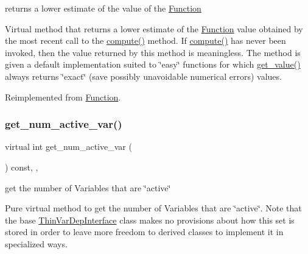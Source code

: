 returns a lower estimate of the value of the \mbox{\hyperlink{class_s_m_spp__di__unipi__it_1_1_function}{Function}} 

Virtual method that returns a lower estimate of the \mbox{\hyperlink{class_s_m_spp__di__unipi__it_1_1_function}{Function}} value obtained by the most recent call to the \mbox{\hyperlink{class_s_m_spp__di__unipi__it_1_1_function_a504d4e3e174c7a518cc66156a8a45ce5}{compute()}} method. If \mbox{\hyperlink{class_s_m_spp__di__unipi__it_1_1_function_a504d4e3e174c7a518cc66156a8a45ce5}{compute()}} has never been invoked, then the value returned by this method is meaningless. The method is given a default implementation suited to \char`\"{}easy\char`\"{} functions for which \mbox{\hyperlink{class_s_m_spp__di__unipi__it_1_1_d_quad_function_ae74d8c7f3dc6100820de31198c77ca25}{get\+\_\+value()}} always returns \char`\"{}exact\char`\"{} (save possibly unavoidable numerical errors) values. 

Reimplemented from \mbox{\hyperlink{class_s_m_spp__di__unipi__it_1_1_function_aa55bc7e19736e8d640ad31ec134b94fb}{Function}}.

\mbox{\label{class_s_m_spp__di__unipi__it_1_1_d_quad_function_af7f92d9890df5e47c25215b99f97caef}} 
\subsubsection{\texorpdfstring{get\+\_\+num\+\_\+active\+\_\+var()}{get\_num\_active\_var()}}
{\footnotesize\ttfamily virtual int get\+\_\+num\+\_\+active\+\_\+var (\begin{DoxyParamCaption}\item[{void}]{ }\end{DoxyParamCaption}) const\hspace{0.3cm}{\ttfamily [inline]}, {\ttfamily [override]}, {\ttfamily [virtual]}}



get the number of Variables that are \char`\"{}active\char`\"{} 

Pure virtual method to get the number of Variables that are \char`\"{}active\char`\"{}. Note that the base \mbox{\hyperlink{class_s_m_spp__di__unipi__it_1_1_thin_var_dep_interface}{Thin\+Var\+Dep\+Interface}} class makes no provisions about how this set is stored in order to leave more freedom to derived classes to implement it in specialized ways. 

